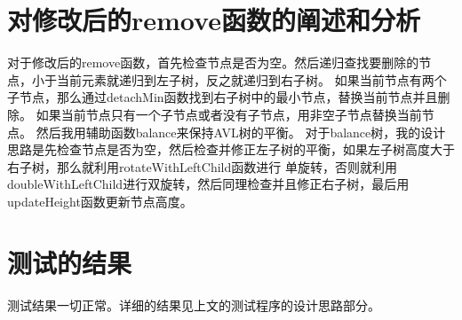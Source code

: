 \documentclass[UTF8]{ctexart}
\begin{document}
\pagestyle{fancy}
\fancyhead{}

\section{对修改后的remove函数的阐述和分析}
对于修改后的remove函数，首先检查节点是否为空。然后递归查找要删除的节点，小于当前元素就递归到左子树，反之就递归到右子树。
如果当前节点有两个子节点，那么通过detachMin函数找到右子树中的最小节点，替换当前节点并且删除。
如果当前节点只有一个子节点或者没有子节点，用非空子节点替换当前节点。
然后我用辅助函数balance来保持AVL树的平衡。
对于balance树，我的设计思路是先检查节点是否为空，然后检查并修正左子树的平衡，如果左子树高度大于右子树，那么就利用rotateWithLeftChild函数进行
单旋转，否则就利用doubleWithLeftChild进行双旋转，然后同理检查并且修正右子树，最后用updateHeight函数更新节点高度。


\section{测试的结果}

测试结果一切正常。详细的结果见上文的测试程序的设计思路部分。
\end{document}
